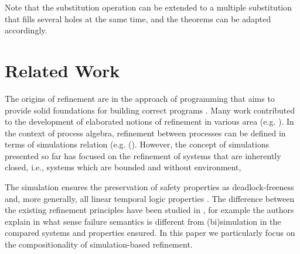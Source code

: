 \documentclass[runningheads]{llncs}
\begin{document}



%
%
%
%

Note that the substitution operation can be extended to a multiple substitution that fills several holes at the same time, and the theorems can be adapted accordingly.


\section{Related Work}
\label{sec:sota}



The origins of refinement are in the  approach of programming that aims to provide solid foundations for building correct programs \cite{Dijkstra76}.  Many work  contributed to the  development of elaborated notions of refinement  in various area (e.g. \cite{BACK1990133,Abrialbooks96,soton250550,Bellegarde:2000}).
In the context of process algebra, refinement between processes can be defined in terms of simulations relation (e.g. (\cite{Jifeng:1089,Milner:1980}). However, the concept of simulations presented so far has focused on the refinement of systems that are inherently closed, i.e., systems which are bounded and without environment,

The simulation  ensures the preservation of   
safety properties as deadlock-freeness  and, more generally, 
all linear temporal logic properties \cite{Abrialbooks96,Kouchnarenko:2007}.
The difference between the existing refinement principles have been studied in \cite{10.5555/640428.640430}, for example the authors explain in what sense failure semantics is different from  (bi)simulation in the compared systems and properties ensured. In this paper we particularly focus on the compositionality of simulation-based refinement.
 
\end{document}
